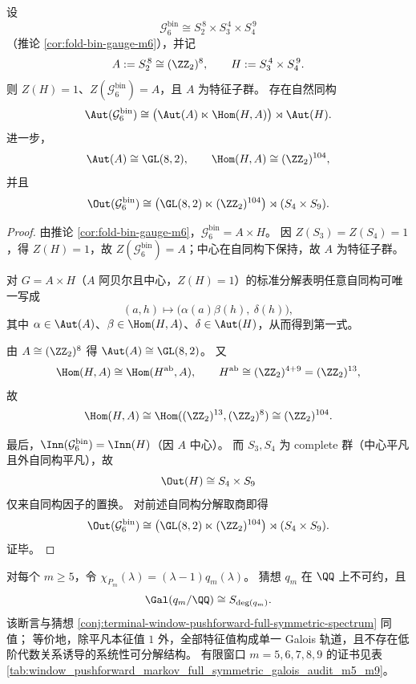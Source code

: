 \begin{theorem}\label{thm:terminal-window6-fold-gauge-aut-out-structure}
设
\[
\mathcal G^{\mathrm{bin}}_6\cong S_2^{\,8}\times S_3^{\,4}\times S_4^{\,9}
\]
（推论 \ref{cor:fold-bin-gauge-m6}），并记
\[
A:=S_2^{\,8}\cong(\ZZ_2)^8,\qquad H:=S_3^{\,4}\times S_4^{\,9}.
\]
则 \(Z(H)=1\)、\(Z(\mathcal G^{\mathrm{bin}}_6)=A\)，且 \(A\) 为特征子群。
存在自然同构
\[
\Aut(\mathcal G^{\mathrm{bin}}_6)
\cong
\bigl(\Aut(A)\ltimes\Hom(H,A)\bigr)\rtimes\Aut(H).
\]
进一步，
\[
\Aut(A)\cong \GL(8,2),\qquad
\Hom(H,A)\cong(\ZZ_2)^{104},
\]
并且
\[
\Out(\mathcal G^{\mathrm{bin}}_6)
\cong
\bigl(\GL(8,2)\ltimes(\ZZ_2)^{104}\bigr)\rtimes(S_4\times S_9).
\]
\end{theorem}
\begin{proof}
由推论 \ref{cor:fold-bin-gauge-m6}，\(\mathcal G^{\mathrm{bin}}_6=A\times H\)。
因 \(Z(S_3)=Z(S_4)=1\)，得 \(Z(H)=1\)，故 \(Z(\mathcal G^{\mathrm{bin}}_6)=A\)；中心在自同构下保持，故 \(A\) 为特征子群。

对 \(G=A\times H\)（\(A\) 阿贝尔且中心，\(Z(H)=1\)）的标准分解表明任意自同构可唯一写成
\[
(a,h)\longmapsto \bigl(\alpha(a)\beta(h),\ \delta(h)\bigr),
\]
其中 \(\alpha\in\Aut(A)\)、\(\beta\in\Hom(H,A)\)、\(\delta\in\Aut(H)\)，从而得到第一式。

由 \(A\cong(\ZZ_2)^8\) 得 \(\Aut(A)\cong\GL(8,2)\)。
又
\[
\Hom(H,A)\cong\Hom(H^{\mathrm{ab}},A),\qquad
H^{\mathrm{ab}}\cong(\ZZ_2)^{4+9}=(\ZZ_2)^{13},
\]
故
\[
\Hom(H,A)\cong\Hom((\ZZ_2)^{13},(\ZZ_2)^8)\cong(\ZZ_2)^{104}.
\]

最后，\(\Inn(\mathcal G^{\mathrm{bin}}_6)=\Inn(H)\)（因 \(A\) 中心）。
而 \(S_3,S_4\) 为 complete 群（中心平凡且外自同构平凡），故
\[
\Out(H)\cong S_4\times S_9
\]
仅来自同构因子的置换。
对前述自同构分解取商即得
\[
\Out(\mathcal G^{\mathrm{bin}}_6)
\cong
\bigl(\GL(8,2)\ltimes(\ZZ_2)^{104}\bigr)\rtimes(S_4\times S_9).
\]
证毕。
\end{proof}

\begin{conjecture}\label{conj:terminal-window-pushforward-maximal-galois-universality}
对每个 \(m\ge 5\)，令 \(\chi_{P_m}(\lambda)=(\lambda-1)q_m(\lambda)\)。
猜想 \(q_m\) 在 \(\QQ\) 上不可约，且
\[
\Gal(q_m/\QQ)\cong S_{\deg(q_m)}.
\]
该断言与猜想 \ref{conj:terminal-window-pushforward-full-symmetric-spectrum} 同值；
等价地，除平凡本征值 \(1\) 外，全部特征值构成单一 Galois 轨道，且不存在低阶代数关系诱导的系统性可分解结构。
有限窗口 \(m=5,6,7,8,9\) 的证书见表 \ref{tab:window_pushforward_markov_full_symmetric_galois_audit_m5_m9}。
\end{conjecture}

